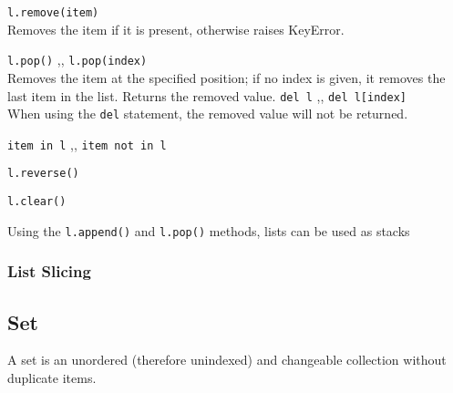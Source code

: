 \begin{itemize}
       \texttt{l.remove(item)} \\
      Removes the item if it is present, otherwise raises KeyError.

      \begin{itemize}
           \texttt{l.pop()} \sep{,}
          \texttt{l.pop(index)} \\
          Removes the item at the specified position; if no index is given, it removes the last item
          in the list. Returns the removed value.
           \texttt{del l} \sep{,}
          \texttt{del l[index]} \\
          When using the \texttt{del} statement, the removed value will not be returned.
      \end{itemize}
      

       \texttt{item in l} \sep{,}
      \texttt{item not in l}

       \texttt{l.reverse()}


       \texttt{l.clear()}

      Using the \texttt{l.append()} and \texttt{l.pop()} methods, lists
      can be used as stacks

    \end{itemize}

    \subsubsection{List Slicing} \label{List Slicing}

  \subsection{Set}
    A set is an unordered (therefore unindexed) and  changeable collection without duplicate items.

